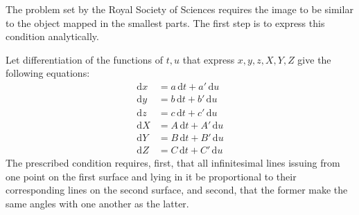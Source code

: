 The problem set by the Royal Society of Sciences requires the image to be similar to the object mapped in the smallest parts. The first step is to express this condition analytically.

Let differentiation of the functions of \(t,u\) that express \(x,\allowbreak y,\allowbreak z,\allowbreak X,\allowbreak Y,\allowbreak Z\) give the following equations:
\[
\begin{aligned}
\mathrm{d}x&=a\,\mathrm{d}t+a'\,\mathrm{d}u\\
\mathrm{d}y&=b\,\mathrm{d}t+b'\,\mathrm{d}u\\
\mathrm{d}z&=c\,\mathrm{d}t+c'\,\mathrm{d}u\\
\mathrm{d}X&=A\,\mathrm{d}t+A'\,\mathrm{d}u\\
\mathrm{d}Y&=B\,\mathrm{d}t+B'\,\mathrm{d}u\\
\mathrm{d}Z&=C\,\mathrm{d}t+C'\,\mathrm{d}u
\end{aligned}
\]
\noindent The prescribed condition requires, first, that all infinitesimal lines issuing from one point on the first surface and lying in it be proportional to their corresponding lines on the second surface, and second, that the former make the same angles with one another as the latter.

